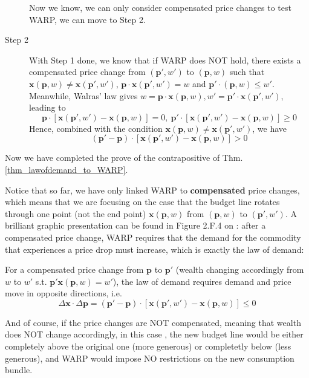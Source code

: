 \begin{description}
    Now we know, we can only consider compensated price changes to test WARP, we can move to Step 2.
    \item[Step 2] With Step 1 done, we know that if WARP does NOT hold, there exists a compensated price change from $(\mathbf{p}',w')$ to $(\mathbf{p},w)$ such that $\mathbf{x}(\mathbf{p},w)\neq \mathbf{x}(\mathbf{p}',w')$, $\mathbf{p}\cdot \mathbf{x}(\mathbf{p}',w')=w$ and $\mathbf{p'}\cdot (\mathbf{p},w)\leq w'$. 
    Meanwhile, Walras' law gives $w= \mathbf{p}\cdot\mathbf{x}(\mathbf{p},w),w'=\mathbf{p}'\cdot\mathbf{x}(\mathbf{p}',w')$, leading to 
    $$\mathbf{p}\cdot\left[\mathbf{x}(\mathbf{p}',w')-\mathbf{x}(\mathbf{p},w)\right]=0,\ \mathbf{p}'\cdot\left[\mathbf{x}(\mathbf{p}',w')-\mathbf{x}(\mathbf{p},w)\right]\geq 0$$
    Hence, combined with the condition $\mathbf{x}(\mathbf{p},w)\neq \mathbf{x}(\mathbf{p}',w')$, we have
    $$(\mathbf{p}'-\mathbf{p})\cdot\left[\mathbf{x}(\mathbf{p}',w')-\mathbf{x}(\mathbf{p},w)\right]> 0$$ 
\end{description}
Now we have completed the prove of the contrapositive of Thm.\ref{thm_lawofdemand_to_WARP}.

Notice that so far, we have only linked WARP to \textbf{compensated} price changes, which means that we are focusing on the case that the budget line rotates through one point (not the end point) $\mathbf{x}(\mathbf{p},w)$ from $(\mathbf{p},w)$ to $(\mathbf{p}',w')$. A brilliant graphic presentation can be found in Figure 2.F.4 on \citet[Page 33]{mas1995microeconomic}: after a compensated price change, WARP requires that the demand for the commodity that experiences a price drop must increase, which is exactly the law of demand:
\begin{theorem}\label{thm_compensated_lawofdemand}
    For a compensated price change from $\mathbf{p}$ to $\mathbf{p}'$ (wealth changing accordingly from $w$ to $w'$ s.t. $\mathbf{p}'\mathbf{x}(\mathbf{p},w)=w'$), the law of demand requires demand and price move in opposite directions, i.e.
    $$\Delta \mathbf{x}\cdot \Delta \mathbf{p} = (\mathbf{p}'-\mathbf{p})\cdot [\mathbf{x}(\mathbf{p}',w')-\mathbf{x}(\mathbf{p},w)]\leq 0$$
\end{theorem}

And of course, if the price changes are NOT compensated, meaning that wealth does NOT change accordingly, in this case \citep[Figure 2.F.5, Page 33]{mas1995microeconomic}, the new budget line would be either completely above the original one (more generous) or completetly below (less generous), and WARP would impose NO restrictions on the new consumption bundle.

